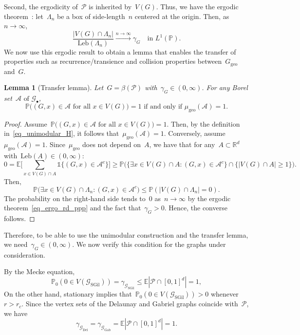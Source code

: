 \documentclass[a4paper,11pt]{article}
\newcommand{\EE}{\mathbb{E}}
\newcommand{\PP}{\mathbb{P}}
\newcommand{\RR}{\mathbb{R}}
\newtheorem{lemma}{Lemma}
\theoremstyle{definition}
\begin{document}
Second, the ergodicity of~$\mathcal P$ is inherited by~$V(G)$. Thus, we have the ergodic theorem~\cite[Theorem 8.14]{LastPenrose2017}: let~$\Lambda_n$ be a box of side-length~$n$ centered at the origin. Then, as~$n \to \infty$,  
\begin{equation}\label{eq_ergo_rd_ppp}
    \frac{|V(G) \cap \Lambda_n| }{\mathrm{Leb}(\Lambda_n)} \xrightarrow{ n \to \infty} \gamma_G \quad \text{in } L^1(\PP).
\end{equation}
We now use this ergodic result to obtain a lemma that enables the transfer of properties such as recurrence/transience and collision properties between~$G_{\mathrm{geo}}$ and~$G$. 

\begin{lemma}[Transfer lemma]\label{lemma_translate_as}
Let~$G = \beta(\mathcal P)$ with~$\gamma_G \in (0,\infty)$. For any Borel set~$\mathcal A \text{ of } \mathcal G_\bullet$,
$$ \PP\big((G,x) \in \mathcal A \text{ for all } x \in V(G) \big) = 1 \text{ if and only if } \mu_\mathrm{geo}(\mathcal A) = 1.$$
\end{lemma}
\begin{proof}
Assume~$\PP\big((G,x) \in \mathcal A \text{ for all } x \in V(G) \big) = 1$. Then, by the definition in~\eqref{eq_unimodular_H}, it follows that~$\mu_\mathrm{geo}(\mathcal A) = 1$. Conversely, assume~$\mu_\mathrm{geo}(\mathcal A) = 1$. Since~$\mu_\mathrm{geo}$ does not depend on~$A$, we have that for any~$A \subset \RR^d$ with~$\mathrm{Leb}(A) \in (0,\infty)$:
$$ 0 = \EE \Big[ \sum_{x \in V(G) \cap A}\mathds{1}\{ (G,x) \in \mathcal A^c \} \Big] \ge \PP \big( \{ \exists x \in V(G) \cap A: (G,x) \in \mathcal A^c\} \cap \{|V(G) \cap A| \ge 1\} \big).$$
Then,
$$ \PP \big( \exists x \in V(G) \cap \Lambda_n: (G,x) \in \mathcal A^c \big) \leq \PP( |V(G) \cap \Lambda_n| = 0 ).$$
The probability on the right-hand side tends to~0 as~$n \to \infty$ by the ergodic theorem~\eqref{eq_ergo_rd_ppp} and the fact that~$\gamma_G > 0$. Hence, the converse follows.
\end{proof}

Therefore, to be able to use the unimodular construction and the transfer lemma, we need~$\gamma_G \in (0,\infty)$. We now verify this condition for the graphs under consideration. 

By the Mecke equation, 
$$ \PP_0( 0 \in V(\mathcal G_\mathrm{SGil}) ) = \gamma_{\mathcal G_\mathrm{SGil}} \leq \EE |\mathcal P \cap [0,1]^d| = 1, $$
On the other hand, stationary implies that~$\PP_0( 0 \in V(\mathcal G_\mathrm{SGil}) )>0$ whenever~$r > r_c$. Since the vertex sets of the Delaunay and Gabriel graphs coincide with~$\mathcal P$, we have
$$ \gamma_{\mathcal G_\mathrm{Del}} = \gamma_{\mathcal G_\mathrm{Gab}} = \EE |\mathcal P \cap [0,1]^d| = 1.$$
\end{document}
